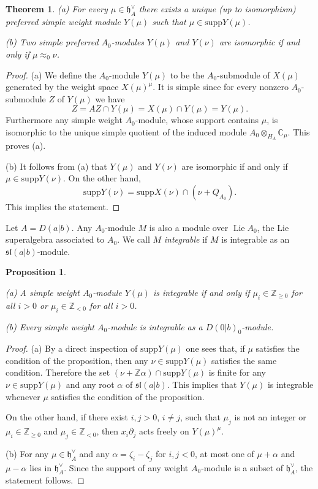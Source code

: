 \documentclass[12pt]{amsart}
\theoremstyle{plain} %
\numberwithin{equation}{section}
\theoremstyle{definition}
\theoremstyle{remark}
\theoremstyle{plain} %
\newtheorem{theorem}[definition]{Theorem}
\newtheorem{proposition}[definition]{Proposition}
\newcommand{\supp}{\mathrm{supp}}
\newcommand{\gh}{\mathfrak{h}}
\def\gh{\mathfrak{h}}
\begin{document}
    \begin{theorem}\label{Zero}
      (a) For every $\mu\in \gh_A^\vee$ there exists a unique (up to isomorphism) preferred simple weight module $Y(\mu)$ such that $\mu\in\supp Y(\mu)$.

      (b) Two simple preferred $A_0$-modules $Y(\mu)$ and $Y(\nu)$ are isomorphic if and only if  $\mu\approx_{0}\nu$.
      \end{theorem}
      \begin{proof} (a) We define the $A_0$-module $Y(\mu)$ to be the $A_0$-submodule of $X(\mu)$ generated by the weight space $X(\mu)^\mu$. It is simple
        since  for every nonzero $A_0$-submodule $Z$ of $Y(\mu)$ we have 
        $$
        Z = AZ\cap Y(\mu)=X(\mu) \cap Y(\mu) = Y(\mu).$$ Furthermore any simple weight $A_0$-module, whose 
        support contains $\mu$, is isomorphic to the unique simple quotient of the induced module $A_0\otimes_{H_A}\mathbb C_\mu$. This proves (a).
        
        (b) It follows from (a) that $Y(\mu)$ and $Y(\nu)$ are isomorphic if and only if $\mu\in\supp Y(\nu)$. On the other hand,
        $$\supp Y(\nu)=\supp X(\nu)\cap (\nu+Q_{A_0}).$$
      This implies the statement.
        \end{proof}
    Let $A=D(a|b)$. Any $A_0$-module $M$ is also a module over $\operatorname{Lie}A_0$, the Lie superalgebra associated to $A_0$.  We call $M$
    {\it integrable} if $M$ is integrable as an $\mathfrak{sl}(a|b)$-module.
    \begin{proposition}\label{integrable}

      (a) A simple  weight $A_0$-module $Y(\mu)$ is integrable if and only if $\mu_i\in\mathbb Z_{\geq 0}$
      for all $i>0$ or $\mu_i\in\mathbb Z_{<0}$ for all $i>0$.

      (b) Every simple weight $A_0$-module is integrable as a  $D(0|b)_0$-module.
    \end{proposition}
    \begin{proof} (a) By a direct inspection of $\supp Y(\mu)$ one sees that, if $\mu$ satisfies the condition of the proposition, then any
      $\nu\in\supp Y(\mu)$
      satisfies the same
      condition. Therefore the set $(\nu+\mathbb Z\alpha)\cap\supp Y(\mu)$ is finite for any    $\nu\in\supp Y(\mu)$ and any root $\alpha$ of
      $\mathfrak{sl}(a|b)$.
    This implies that $Y(\mu)$ is integrable whenever $\mu$ satisfies the condition of the proposition.

      On the other hand, if there exist $i,j>0$, $i\neq j$, such that $\mu_j$ is not an integer or
      $\mu_i\in\mathbb Z_{\geq 0}$ and $\mu_j\in\mathbb Z_{<0}$, then $x_i\partial_j$ acts freely on $Y(\mu)^\mu$.

      (b) For any $\mu\in\gh^\vee_A$ and any $\alpha=\zeta_i-\zeta_j$ for $i,j<0$, at most one of $\mu+\alpha$ and $\mu-\alpha$ lies in $\gh^\vee_A$.
      Since the support of any weight $A_0$-module is a subset of  $\gh^\vee_A$, the statement follows.
      \end{proof}
\end{document}
